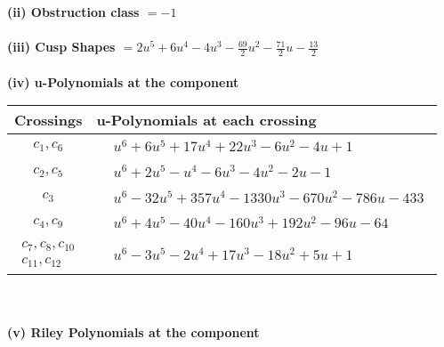 \documentclass[1p]{elsarticle_modified}
\theoremstyle{definition}
\begin{document}
\flushleft \textbf{(ii) Obstruction class $= -1$}\\~\\
\flushleft \textbf{(iii) Cusp Shapes $= 2 u^5+6 u^4-4 u^3-\frac{69}{2} u^2-\frac{71}{2} u-\frac{13}{2}$}\\~\\
\newpage\renewcommand{\arraystretch}{1}
\flushleft \textbf{(iv) u-Polynomials at the component}\newline \\
\begin{tabular}{m{50pt}|m{274pt}}
Crossings & \hspace{64pt}u-Polynomials at each crossing \\
\hline $$\begin{aligned}c_{1},c_{6}\end{aligned}$$&$\begin{aligned}
&u^6+6 u^5+17 u^4+22 u^3-6 u^2-4 u+1
\end{aligned}$\\
\hline $$\begin{aligned}c_{2},c_{5}\end{aligned}$$&$\begin{aligned}
&u^6+2 u^5- u^4-6 u^3-4 u^2-2 u-1
\end{aligned}$\\
\hline $$\begin{aligned}c_{3}\end{aligned}$$&$\begin{aligned}
&u^6-32 u^5+357 u^4-1330 u^3-670 u^2-786 u-433
\end{aligned}$\\
\hline $$\begin{aligned}c_{4},c_{9}\end{aligned}$$&$\begin{aligned}
&u^6+4 u^5-40 u^4-160 u^3+192 u^2-96 u-64
\end{aligned}$\\
\hline $$\begin{aligned}c_{7},c_{8},c_{10}\\c_{11},c_{12}\end{aligned}$$&$\begin{aligned}
&u^6-3 u^5-2 u^4+17 u^3-18 u^2+5 u+1
\end{aligned}$\\
\hline
\end{tabular}\\~\\
\newpage\renewcommand{\arraystretch}{1}
\flushleft \textbf{(v) Riley Polynomials at the component}\newline \\
\end{document}
